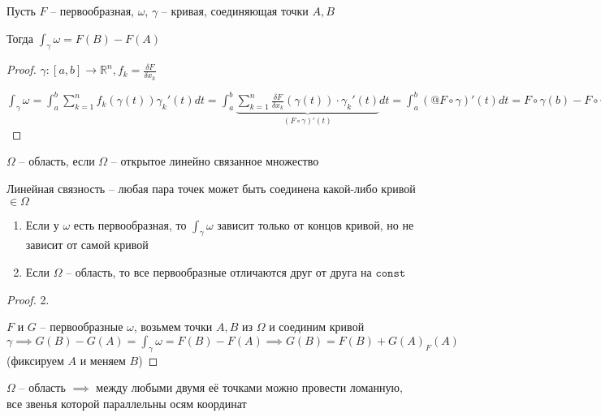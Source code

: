 \begin{theorem}
    Пусть $F$ -- первообразная, $\omega$, $\gamma$ -- кривая, соединяющая точки $A, B$

    Тогда $\int_{\gamma}^{}\omega = F(B) - F(A)$
\end{theorem}

\begin{proof}
    $\gamma: [a, b] \to \mathbb{R}^n, f_k = \frac{\delta F}{\delta x_k}$

    $\int_{\gamma}^{}\omega = \int_{a}^{b}\sum_{k = 1}^{n}f_k(\gamma(t))\gamma_k'(t) dt = \int_{a}^{b}\underbrace{\sum_{k = 1}^{n} \frac{\delta F}{\delta x_k}(\gamma(t)) \cdot \gamma_k'(t)}_{(F \circ \gamma)'(t)} dt = \int_{a}^{b}(@F \circ \gamma)'(t) dt = F \circ \gamma(b) - F \circ \gamma(a) = F(\gamma(b)) - F(\gamma(a))$
\end{proof}

\begin{definition}
    $\Omega$ -- область, если $\Omega$ -- открытое линейно связанное множество

    Линейная связность -- любая пара точек может быть соединена какой-либо кривой $\in \Omega$
\end{definition}

\begin{consequence}
    \begin{enumerate}
        \item Если у $\omega$ есть первообразная, то $\int_{\gamma}^{}\omega$ зависит только от концов кривой, но не зависит от самой кривой
        \item Если $\Omega$ -- область, то все первообразные отличаются друг от друга на $\texttt{const}$
    \end{enumerate}
\end{consequence}

\begin{proof}
    2. \item $F$ и $G$ -- первообразные $\omega$, возьмем точки $A, B$ из $\Omega$ и соединим кривой $\gamma \implies G(B) - G(A) = \int_{\gamma}^{}\omega = F(B) - F(A) \implies G(B) = F(B) + G(A) _ F(A)$ (фиксируем $A$ и меняем $B$)
\end{proof}

\begin{lemma}
    $\Omega$ -- область $\implies$ между любыми двумя её точками можно провести ломанную, все звенья которой параллельны осям координат

\end{lemma}

